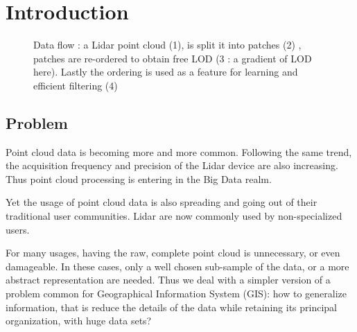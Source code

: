 

\section{Introduction}

\begin{figure}[t!]
	\begin{center}
		\caption{Data flow : a Lidar point cloud (1), is split it into patches (2) , patches are re-ordered to obtain free LOD (3 : a gradient of LOD here). Lastly the ordering is used as a feature for learning and efficient filtering (4) } 
		\label{fig:banner_image}
	\end{center}
\end{figure} 

	\subsection{Problem}  
		Point cloud data is becoming more and more common. Following the same trend, the acquisition frequency and precision of the Lidar device are also increasing.
		Thus point cloud processing is entering in the Big Data realm.
		
		Yet the usage of point cloud data is also spreading and going out of their traditional user communities. 
		Lidar are now commonly used by non-specialized users. 
		
		
		For many usages, having the raw, complete point cloud is unnecessary, or even damageable. In these cases, only a well chosen sub-sample of the data, or a more abstract representation are needed.
		Thus we deal with a simpler version of a problem common for Geographical Information System (GIS): how to generalize information, that is reduce the details of the data while retaining its principal organization, with huge data sets?
		
